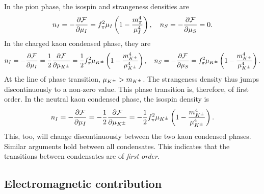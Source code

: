In the pion phase, the isospin and strangeness densities are
%
\begin{equation}
    n_I = - \pdv{\mathcal{F}}{\mu_I} = f_\pi^2 \mu_I \left( 1 - \frac{m_\pi^4}{\mu_I^4} \right), \quad
    n_S = - \pdv{\mathcal{F}}{\mu_S} = 0.
\end{equation}
%
In the charged kaon condensed phase, they are
%
\begin{equation}
    n_I = - \pdv{\mathcal{F}}{\mu_I} 
    = \frac{1}{2} \pdv{\mathcal{F}}{\mu_{K^\pm}}
    = \frac{1}{2} f^2_\pi \mu_{K^\pm} \left( 1 - \frac{m_{K^\pm}^4}{\mu_{K^\pm}^4} \right), \quad
    n_S = - \pdv{\mathcal{F}}{\mu_S} = f_\pi^2 \mu_{K^\pm}  \left( 1 - \frac{m_{K^\pm}^4}{\mu_{K^\pm}^4} \right).
\end{equation}
%
At the line of phase transition, $\mu_{K^\pm} > m_{K^\pm}$.
The strangeness density thus jumps discontinuously to a non-zero value.
This phase transition is, therefore, of first order.
In the neutral kaon condensed phase, the isospin density is
%
\begin{equation}
    n_I = - \pdv{\mathcal{F}}{\mu_I} 
    = -\frac{1}{2} \pdv{\mathcal{F}}{\mu_{K^\pm}}
    = - \frac{1}{2}  f^2_\pi \mu_{K^\pm} \left( 1 - \frac{m_{K^\pm}^4}{\mu_{K^\pm}^4} \right).
\end{equation}
%
This, too, will change discontinuously between the two kaon condensed phases.
Similar arguments hold between all condensates.
This indicates that the transitions between condensates are of \emph{first order}.




\subsection{Electromagnetic contribution}

